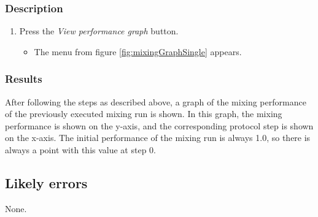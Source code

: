 \subsubsection{Description}\label{subsubsec:viewsinglegraphDesc}
\begin{enumerate}
	\item Press the \emph{View performance graph} button.
		\begin{itemize}
			\item The menu from figure \ref{fig:mixingGraphSingle} appears.
		\end{itemize}	
\end{enumerate}


\subsubsection{Results}
After following the steps as described above, a graph of the mixing performance of the previously executed mixing run is shown. In this graph, the mixing performance is shown on the y-axis, and the corresponding protocol step is shown on the x-axis. The initial performance of the mixing run is always 1.0, so there is always a point with this value at step 0.

\subsection{Likely errors}
None.

